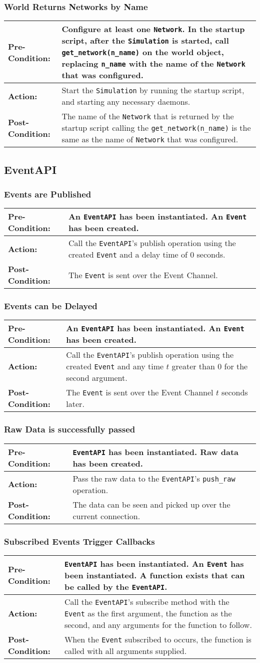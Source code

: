 \documentclass[titlepage]{article}
\newcommand{\testcase}[3]{
    \begin{center}
    \begin{tabular}{| l | p{0.7\textwidth}|}
        \hline
        \rowcolor[gray]{0.8}\textbf{Pre-Condition:} & #1 \\ \hline
        \textbf{Action:} & #2 \\ \hline
        \rowcolor[gray]{0.8}\textbf{Post-Condition:} & #3 \\ \hline
    \end{tabular}
    \end{center}
}
\begin{document}
\subsubsection{World Returns Networks by Name}
\testcase{Configure at least one \texttt{Network}.  In the startup script, after the \texttt{Simulation} is started, call \texttt{get\_network(n\_name)} on the world object, replacing \texttt{n\_name} with the name of the \texttt{Network} that was configured.}{Start the \texttt{Simulation} by running the startup script, and starting any necessary daemons.}{The name of the \texttt{Network} that is returned by the startup script calling the \texttt{get\_network(n\_name)} is the same as the name of \texttt{Network} that was configured.}

\subsection{EventAPI}
\subsubsection{Events are Published}
\testcase{An \texttt{EventAPI} has been instantiated. An \texttt{Event} has been created.}{Call the \texttt{EventAPI}'s publish operation using the created \texttt{Event} and a delay time of 0 seconds.}{The \texttt{Event} is sent over the Event Channel.}

\subsubsection{Events can be Delayed}
\testcase{An \texttt{EventAPI} has been instantiated. An \texttt{Event} has been created.}{Call the \texttt{EventAPI}'s publish operation using the created \texttt{Event} and any time $t$ greater than 0 for the second argument.}{The \texttt{Event} is sent over the Event Channel $t$ seconds later.}

\subsubsection{Raw Data is successfully passed}
\testcase{\texttt{EventAPI} has been instantiated. Raw data has been created.}{Pass the raw data to the \texttt{EventAPI}'s \texttt{push\_raw} operation.}{The data can be seen and picked up over the current connection.}

\subsubsection{Subscribed Events Trigger Callbacks}
\testcase{\texttt{EventAPI} has been instantiated.  An \texttt{Event} has been instantiated. A function exists that can be called by the \texttt{EventAPI}.}{Call the \texttt{EventAPI}'s subscribe method with the \texttt{Event} as the first argument, the function as the second, and any arguments for the function to follow.}{When the \texttt{Event} subscribed to occurs, the function is called with all arguments supplied. }
\end{document}
